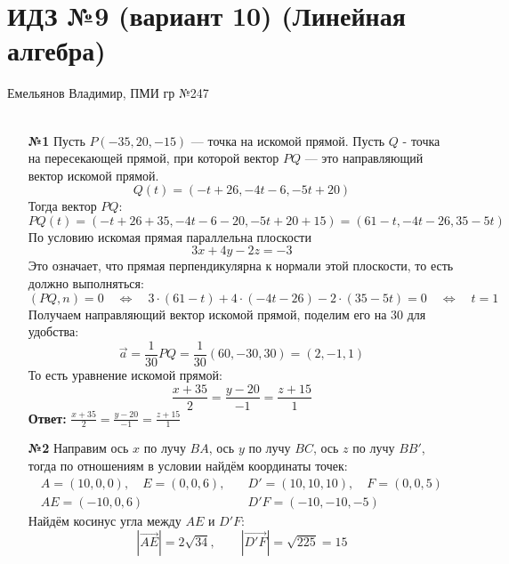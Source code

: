 \documentclass[a4paper]{article}
\renewcommand{\f}[2]{\frac{#1}{#2}}
\newcommand{\lr}{\Leftrightarrow}
\begin{document}
\section*{ИДЗ №9 (вариант 10) (Линейная алгебра)}
 {\large Емельянов Владимир, ПМИ гр №247}\\\\
\begin{enumerate}
    \item[\textbf{№1}]Пусть $P(-35,20,-15)$ --- точка на искомой прямой. Пусть $Q$ - точка на пересекающей прямой, при которой вектор $PQ$ --- это направляющий вектор искомой прямой.
    $$Q(t) = (-t+26, -4t-6, -5t+20)$$
    Тогда вектор $PQ$:
    $$PQ(t) = (-t+26+35, -4t-6-20, -5t+20+15) = (61-t, -4t-26, 35-5t)$$
    По условию искомая прямая параллельна плоскости 
    $$3x+4y-2z=-3$$ 
    Это означает, что прямая перпендикулярна к нормали этой плоскости, то есть должно выполняться:
    $$(PQ, n) = 0 \quad \lr \quad  3\cdot(61-t) + 4\cdot(-4t-26) -2\cdot(35-5t) = 0 \quad \lr \quad t = 1$$
    Получаем направляющий вектор искомой прямой, поделим его на $30$ для удобства:
    $$\vec{a} = \f{1}{30}PQ= \f{1}{30}(60, -30, 30) = (2, -1, 1)$$
    То есть уравнение искомой прямой:
    $$\f{x+35}{2} = \f{y-20}{-1} = \f{z+15}{1}$$
    \textbf{Ответ: }$\f{x+35}{2} = \f{y-20}{-1} = \f{z+15}{1}$


    \item[\textbf{№2}]Направим ось $x$ по лучу $BA$, ось $y$ по лучу $BC$, ось $z$ по лучу $BB'$, тогда по отношениям в условии найдём координаты точек:
    $$\begin{aligned}
        A = (10, 0, 0), \quad E = (0, 0, 6), \quad & D' = (10, 10, 10), \quad F = (0, 0, 5)\\
        AE = (-10, 0, 6)\quad & D'F = (-10, -10, -5) 
    \end{aligned}$$
    Найдём косинус угла между $AE$ и $D'F$:
    $$
    |\vec{AE}|=2\sqrt{34},\qquad
    |\vec{D'F}|=\sqrt{225}=15
    $$
\end{enumerate}
\end{document}
